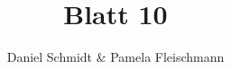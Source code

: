 \documentclass[12pt,a4paper]{amsart}
\begin{document}
\title{Blatt 10}

\author{Daniel Schmidt \& Pamela Fleischmann}

\maketitle

\begin{aufgabe1}
\end{aufgabe1}

\begin{aufgabe1}
\end{aufgabe1}
\end{document}
